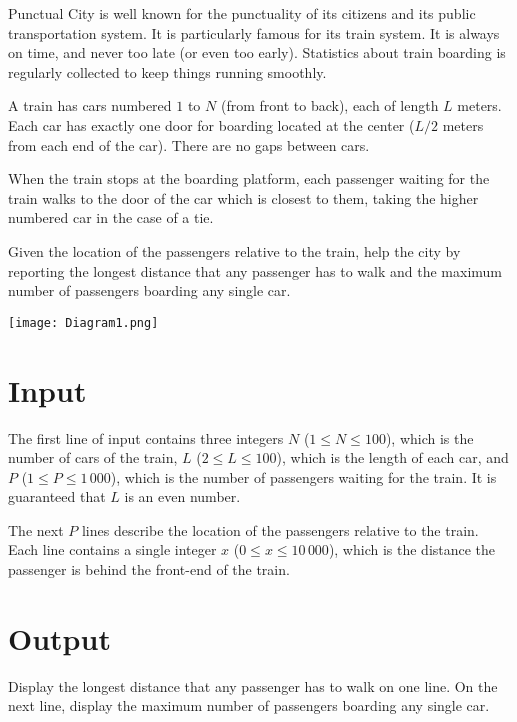 
Punctual City is well known for the punctuality of its citizens and
its public transportation system.  It is particularly famous for its
train system.  It is always on time, and never too late (or even too
early).  Statistics about train boarding is regularly collected to
keep things running smoothly.

A train has cars numbered $1$ to $N$ (from front to back), each of
length $L$ meters. Each car has exactly one door for boarding located
at the center ($L/2$ meters from each end of the car). There are no gaps
between cars.

When the train stops at the boarding platform, each passenger waiting
for the train walks to the door of the car which is closest to them,
taking the higher numbered car in the case of a tie.

Given the location of the passengers relative to the train, help the
city by reporting the longest distance that any passenger has
to walk and the maximum number of passengers boarding any single car.

\begin{center}
  \texttt{[image: Diagram1.png]}
\end{center}

\section*{Input}

The first line of input contains three integers $N$ ($1 \leq N \leq 100$),
which is the number of cars of the train, $L$ ($2 \leq L \leq 100$), which
is the length of each car, and $P$ ($1 \leq P \leq 1\,000$), which is the
number of passengers waiting for the train. It is guaranteed that $L$
is an even number.

The next $P$ lines describe the location of the passengers relative to
the train. Each line contains a single integer $x$
($0 \leq x \leq 10\,000$), which is the distance the passenger is
behind the front-end of the train.

\section*{Output}

Display the longest distance that any passenger has to walk on one
line.  On the next line, display the maximum number of passengers boarding
any single car.
